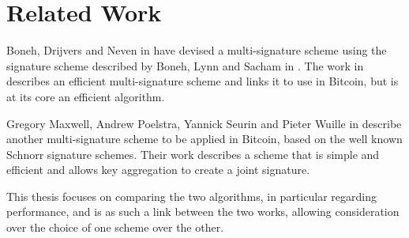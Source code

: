 \chapter{Related Work}
Boneh, Drijvers and Neven in \cite{BLSMulti} have devised a multi-signature scheme using the signature scheme described by Boneh, Lynn and Sacham in \cite{BLS}. The work in \cite{BLSMulti} describes an efficient multi-signature scheme and links it to use in Bitcoin, but is at its core an efficient algorithm.

Gregory Maxwell, Andrew Poelstra, Yannick Seurin and Pieter Wuille in \cite{SchnorrMulti} describe another multi-signature scheme to be applied in Bitcoin, based on the well known Schnorr signature schemes. Their work describes a scheme that is simple and efficient and allows key aggregation to create a joint signature.

This thesis focuses on comparing the two algorithms, in particular regarding performance, and is as such a link between the two works, allowing consideration over the choice of one scheme over the other.
